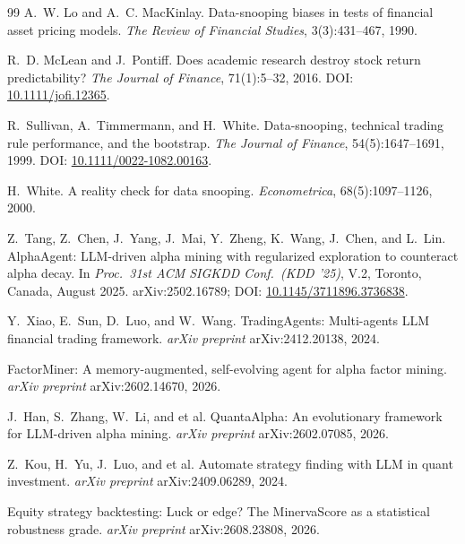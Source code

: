 \documentclass[11pt]{article}
\begin{document}
\begin{thebibliography}{99}
A.~W. Lo and A.~C. MacKinlay.
\newblock Data-snooping biases in tests of financial asset pricing models.
\newblock \emph{The Review of Financial Studies}, 3(3):431--467, 1990.

R.~D. McLean and J.~Pontiff.
\newblock Does academic research destroy stock return predictability?
\newblock \emph{The Journal of Finance}, 71(1):5--32, 2016.
\newblock DOI: \href{https://doi.org/10.1111/jofi.12365}{10.1111/jofi.12365}.

R.~Sullivan, A.~Timmermann, and H.~White.
\newblock Data-snooping, technical trading rule performance, and the bootstrap.
\newblock \emph{The Journal of Finance}, 54(5):1647--1691, 1999.
\newblock DOI: \href{https://doi.org/10.1111/0022-1082.00163}{10.1111/0022-1082.00163}.

H.~White.
\newblock A reality check for data snooping.
\newblock \emph{Econometrica}, 68(5):1097--1126, 2000.

Z.~Tang, Z.~Chen, J.~Yang, J.~Mai, Y.~Zheng, K.~Wang, J.~Chen, and L.~Lin.
\newblock AlphaAgent: LLM-driven alpha mining with regularized exploration to counteract alpha
decay.
\newblock In \emph{Proc.\ 31st ACM SIGKDD Conf.\ (KDD '25)}, V.2, Toronto, Canada, August 2025.
\newblock arXiv:2502.16789; DOI: \href{https://doi.org/10.1145/3711896.3736838}{10.1145/3711896.3736838}.

Y.~Xiao, E.~Sun, D.~Luo, and W.~Wang.
\newblock TradingAgents: Multi-agents LLM financial trading framework.
\newblock \emph{arXiv preprint} arXiv:2412.20138, 2024.

\newblock FactorMiner: A memory-augmented, self-evolving agent for alpha factor mining.
\newblock \emph{arXiv preprint} arXiv:2602.14670, 2026.

J.~Han, S.~Zhang, W.~Li, and et al.
\newblock QuantaAlpha: An evolutionary framework for LLM-driven alpha mining.
\newblock \emph{arXiv preprint} arXiv:2602.07085, 2026.

Z.~Kou, H.~Yu, J.~Luo, and et al.
\newblock Automate strategy finding with LLM in quant investment.
\newblock \emph{arXiv preprint} arXiv:2409.06289, 2024.

\newblock Equity strategy backtesting: Luck or edge? The MinervaScore as a statistical robustness
grade.
\newblock \emph{arXiv preprint} arXiv:2608.23808, 2026.


\end{thebibliography}
\end{document}
